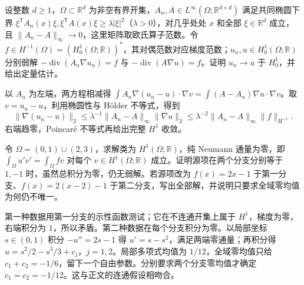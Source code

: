 \begin{exercise}\label{b2:ex:15-coefficient-stability}
设整数 \(d\ge1\)，\(\Omega\subset\mathbb R^d\) 为非空有界开集，\(A_n,A\in L^\infty(\Omega;\mathbb R^{d\times d})\) 满足共同椭圆下界 \(\xi^{\mathsf T}A_n(x)\xi,\xi^{\mathsf T}A(x)\xi\ge\lambda|\xi|^2\)（\(\lambda>0\)），对几乎处处 \(x\) 和全部 \(\xi\in\mathbb R^d\) 成立，且 \(\lVert A_n-A\rVert_\infty\to0\)，这里矩阵取欧氏算子范数。令 \(f\in H^{-1}(\Omega)=(H_0^1(\Omega;\mathbb R))^*\)，其对偶范数对应梯度范数；\(u_n,u\in H_0^1(\Omega;\mathbb R)\) 分别弱解 \(-\operatorname{div}(A_n\nabla u_n)=f\) 与 \(-\operatorname{div}(A\nabla u)=f\)。证明 \(u_n\to u\) 于 \(H_0^1\)，并给出定量估计。
\end{exercise}
\begin{solution}
以 \(A_n\) 为左端，两方程相减得 \(\int A_n\nabla(u_n-u)\cdot\nabla v=\int(A-A_n)\nabla u\cdot\nabla v\)。取 \(v=u_n-u\)，利用椭圆性与 Hölder 不等式，得到
\[\lVert\nabla(u_n-u)\rVert_2\le\lambda^{-1}\lVert A_n-A\rVert_\infty\lVert\nabla u\rVert_2
 \le\lambda^{-2}\lVert A_n-A\rVert_\infty\lVert f\rVert_{H^{-1}}.\]
右端趋零，Poincaré 不等式再给出完整 \(H^1\) 收敛。
\end{solution}

\begin{exercise}\label{b2:ex:15-neumann}
令 \(\Omega=(0,1)\cup(2,3)\)，求解类为 \(H^1(\Omega;\mathbb R)\)，纯 Neumann 通量为零，即 \(\int_\Omega u'v'=\int_\Omega fv\) 对每个 \(v\in H^1(\Omega;\mathbb R)\) 成立。证明源项在两个分支分别等于 \(1,-1\) 时，虽然总积分为零，仍无弱解。若源项改为 \(f(x)=2x-1\) 于第一分支、\(f(x)=2(x-2)-1\) 于第二分支，写出全部解，并说明只要求全域零均值为何仍不唯一。
\end{exercise}
\begin{solution}
第一种数据用第一分支的示性函数测试；它在不连通开集上属于 \(H^1\)，梯度为零，右端积分为 \(1\)，所以矛盾。第二种数据在每个分支积分为零。以局部坐标 \(s\in(0,1)\) 积分 \(-u''=2s-1\) 得 \(u'=s-s^2\)，满足两端零通量；再积分得 \(u=s^2/2-s^3/3+c_j\)，\(j=1,2\)。局部多项式均值为 \(1/12\)，全域零均值只给 \(c_1+c_2=-1/6\)，留下一个自由参数。分别要求两个分支零均值才确定 \(c_1=c_2=-1/12\)。这与正文的连通假设相吻合。
\end{solution}

